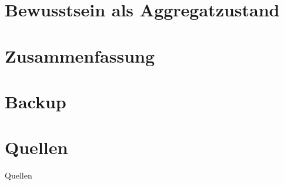 	\section{Bewusstsein als Aggregatzustand}
		\separatorslide
		
		
		
		
		
		
		
		
		
		
		
		
		
	
	\section{Zusammenfassung}
		\separatorslide
	
	
	\section*{Backup}
	\separatorslide	
	
	
	\section*{Quellen}
	\separatorslide
	
	\nocite{Zeh_00}
	\begin{frame}[allowframebreaks]{Quellen}
		\printbibliography
	\end{frame}

